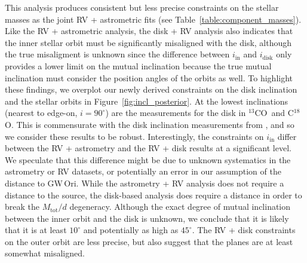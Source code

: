 \documentclass[twocolumn]{aastex61}
\newcommand{\obj}{GW\,Ori}
\newcommand{\thirteen}{${}^{13}$CO}
\newcommand{\eighteen}{C${}^{18}$O}
\begin{document}
This analysis produces consistent but less precise constraints on the stellar masses as the joint RV + astrometric fits (see Table~\ref{table:component_masses}). Like the RV + astrometric analysis, the disk + RV analysis also indicates that the inner stellar orbit must be significantly misaligned with the disk, although the true misaligment is unknown since the difference between $i_\mathrm{in}$ and $i_\mathrm{disk}$ only provides a lower limit on the mutual inclination because the true mutual inclination must consider the position angles of the orbits as well. To highlight these findings, we overplot our newly derived constraints on the disk inclination and the stellar orbits in Figure~\ref{fig:incl_posterior}.
At the lowest inclinations (nearest to edge-on, $i = 90^\circ$) are the measurements for the disk in \thirteen\ and \eighteen. This is commensurate with the disk inclination measurements from \citet{fang17}, and so we consider these results to be robust.
Interestingly, the constraints on $i_\mathrm{in}$ differ between the RV + astrometry and the RV + disk results at a significant level. We speculate that this difference might be due to unknown systematics in the astrometry or RV datasets, or potentially an error in our assumption of the distance to \obj. While the astrometry + RV analysis does not require a distance to the source, the disk-based analysis does require a distance in order to break the $M_\mathrm{tot} / d$ degeneracy. Although the exact degree of mutual inclination between the inner orbit and the disk is unknown, we conclude that it is likely that it is at least $10^\circ$ and potentially as high as $45^\circ$. The RV + disk constraints on the outer orbit are less precise, but also suggest that the planes are at least somewhat misaligned.
\end{document}
